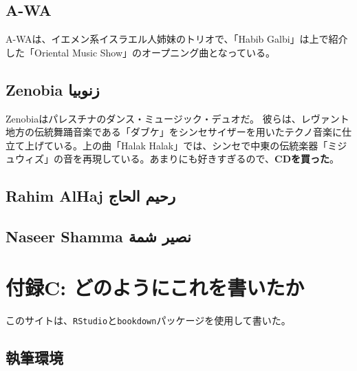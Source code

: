 \documentclass[
]{book}
\begin{document}
\hypertarget{a-wa}{%
\section*{A-WA}\label{a-wa}}

A-WAは、イエメン系イスラエル人姉妹のトリオで、「Habib Galbi」は上で紹介した「Oriental Music Show」のオープニング曲となっている。

\hypertarget{zenobia-ux632ux646ux648ux628ux64aux627}{%
\section*{Zenobia زنوبيا}\label{zenobia-ux632ux646ux648ux628ux64aux627}}

Zenobiaはパレスチナのダンス・ミュージック・デュオだ。
彼らは、レヴァント地方の伝統舞踊音楽である「ダブケ」をシンセサイザーを用いたテクノ音楽に仕立て上げている。上の曲「Halak Halak」では、シンセで中東の伝統楽器「ミジュウィズ」の音を再現している。あまりにも好きすぎるので、\textbf{CDを買った}。

\hypertarget{rahim-alhaj-ux631ux62dux64aux645-ux627ux644ux62dux627ux62c}{%
\section*{Rahim AlHaj رحيم الحاج}\label{rahim-alhaj-ux631ux62dux64aux645-ux627ux644ux62dux627ux62c}}

\hypertarget{naseer-shamma-ux646ux635ux64aux631-ux634ux645ux629}{%
\section*{Naseer Shamma نصير شمة}\label{naseer-shamma-ux646ux635ux64aux631-ux634ux645ux629}}

\hypertarget{appendix_c}{%
\chapter*{付録C: どのようにこれを書いたか}\label{appendix_c}}

このサイトは、\texttt{RStudio}と\texttt{bookdown}パッケージを使用して書いた。

\hypertarget{env}{%
\section*{執筆環境}\label{env}}
\end{document}
